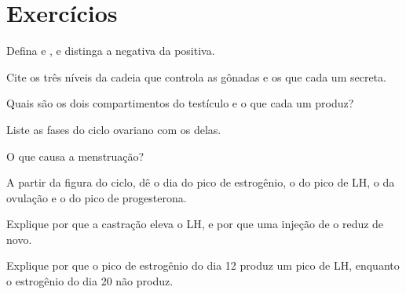 \section{Exercícios}

\begin{exercise}[$\star$]\label{exo:g11:hormones-and-reproduction:1}
Defina  e , e distinga a 
negativa da positiva.
\end{exercise}

\begin{exercise}[$\star$]\label{exo:g11:hormones-and-reproduction:2}
Cite os três níveis da cadeia que controla as gônadas e os 
que cada um secreta.
\end{exercise}

\begin{exercise}[$\star$]\label{exo:g11:hormones-and-reproduction:3}
Quais são os dois compartimentos do testículo e o que cada um produz?
\end{exercise}

\begin{exercise}[$\star$]\label{exo:g11:hormones-and-reproduction:4}
Liste as fases do ciclo ovariano com os  delas.
\end{exercise}

\begin{exercise}[$\star$]\label{exo:g11:hormones-and-reproduction:5}
O que causa a menstruação?
\end{exercise}

\begin{exercise}[$\star\star$]\label{exo:g11:hormones-and-reproduction:6}
A partir da figura do ciclo, dê o dia do pico de estrogênio, o do pico
de LH, o da ovulação e o do pico de progesterona.
\end{exercise}

\begin{exercise}[$\star\star$]\label{exo:g11:hormones-and-reproduction:7}
Explique por que a castração eleva o LH, e por que uma injeção de
 o reduz de novo.
\end{exercise}

\begin{exercise}[$\star\star$]\label{exo:g11:hormones-and-reproduction:8}
Explique por que o pico de estrogênio do dia 12 produz um pico de LH,
enquanto o estrogênio do dia 20 não produz.
\end{exercise}

